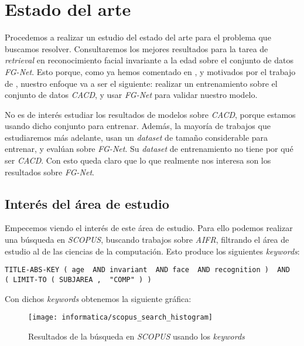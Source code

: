 \chapter{Estado del arte} \label{ich:estado_arte}

Procedemos a realizar un estudio del estado del arte para el problema que buscamos resolver. Consultaremos los mejores resultados para la tarea de \textit{retrieval } en reconocimiento facial invariante a la edad sobre el conjunto de datos \textit{FG-Net}. Esto porque, como ya hemos comentado en , y motivados por el trabajo de \cite{informatica:best_fgnet_model}, nuestro enfoque va a ser el siguiente: realizar un entrenamiento sobre el conjunto de datos \textit{CACD}, y usar \textit{FG-Net} para validar nuestro modelo.

No es de interés estudiar los resultados de modelos sobre \textit{CACD}, porque estamos usando dicho conjunto para entrenar. Además, la mayoría de trabajos que estudiaremos más adelante, usan un \textit{dataset} de tamaño considerable para entrenar, y evalúan sobre \textit{FG-Net}. Su \textit{dataset} de entrenamiento no tiene por qué ser \textit{CACD}. Con esto queda claro que lo que realmente nos interesa son los resultados sobre \textit{FG-Net}.

\section{Interés del área de estudio} \label{isec:interesareaestudio}

Empecemos viendo el interés de este área de estudio. Para ello podemos realizar una búsqueda en \textit{SCOPUS}, buscando trabajos sobre \textit{AIFR}, filtrando el área de estudio al de las ciencias de la computación. Esto produce los siguientes \textit{keywords}:

\begin{lstlisting}[caption=\textit{Keywords usados para la búsqueda en \textit{SCOPUS}}, label=code:scopus_search]
    TITLE-ABS-KEY ( age  AND invariant  AND face  AND recognition )  AND  ( LIMIT-TO ( SUBJAREA ,  "COMP" ) )
\end{lstlisting}

Con dichos \textit{keywords} obtenemos la siguiente gráfica:

\begin{figure}[H]
    \centering
    \texttt{[image: informatica/scopus\_search\_histogram]}
    \caption{Resultados de la búsqueda en \textit{SCOPUS} usando los \textit{keywords} }
\end{figure}

